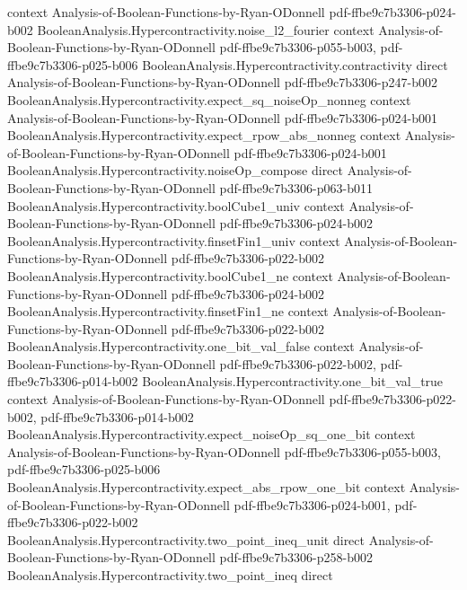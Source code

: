 \begin{lemma}
  {context}
  {Analysis-of-Boolean-Functions-by-Ryan-ODonnell}
  {pdf-ffbe9c7b3306-p024-b002}
\proofstep
  {BooleanAnalysis.Hypercontractivity.noise_l2_fourier}
  {context}
  {Analysis-of-Boolean-Functions-by-Ryan-ODonnell}
  {pdf-ffbe9c7b3306-p055-b003,
    pdf-ffbe9c7b3306-p025-b006}
\proofstep
  {BooleanAnalysis.Hypercontractivity.contractivity}
  {direct}
  {Analysis-of-Boolean-Functions-by-Ryan-ODonnell}
  {pdf-ffbe9c7b3306-p247-b002}
\proofstep
  {BooleanAnalysis.Hypercontractivity.expect_sq_noiseOp_nonneg}
  {context}
  {Analysis-of-Boolean-Functions-by-Ryan-ODonnell}
  {pdf-ffbe9c7b3306-p024-b001}
\proofstep
  {BooleanAnalysis.Hypercontractivity.expect_rpow_abs_nonneg}
  {context}
  {Analysis-of-Boolean-Functions-by-Ryan-ODonnell}
  {pdf-ffbe9c7b3306-p024-b001}
\proofstep
  {BooleanAnalysis.Hypercontractivity.noiseOp_compose}
  {direct}
  {Analysis-of-Boolean-Functions-by-Ryan-ODonnell}
  {pdf-ffbe9c7b3306-p063-b011}
\proofstep
  {BooleanAnalysis.Hypercontractivity.boolCube1_univ}
  {context}
  {Analysis-of-Boolean-Functions-by-Ryan-ODonnell}
  {pdf-ffbe9c7b3306-p024-b002}
\proofstep
  {BooleanAnalysis.Hypercontractivity.finsetFin1_univ}
  {context}
  {Analysis-of-Boolean-Functions-by-Ryan-ODonnell}
  {pdf-ffbe9c7b3306-p022-b002}
\proofstep
  {BooleanAnalysis.Hypercontractivity.boolCube1_ne}
  {context}
  {Analysis-of-Boolean-Functions-by-Ryan-ODonnell}
  {pdf-ffbe9c7b3306-p024-b002}
\proofstep
  {BooleanAnalysis.Hypercontractivity.finsetFin1_ne}
  {context}
  {Analysis-of-Boolean-Functions-by-Ryan-ODonnell}
  {pdf-ffbe9c7b3306-p022-b002}
\proofstep
  {BooleanAnalysis.Hypercontractivity.one_bit_val_false}
  {context}
  {Analysis-of-Boolean-Functions-by-Ryan-ODonnell}
  {pdf-ffbe9c7b3306-p022-b002,
    pdf-ffbe9c7b3306-p014-b002}
\proofstep
  {BooleanAnalysis.Hypercontractivity.one_bit_val_true}
  {context}
  {Analysis-of-Boolean-Functions-by-Ryan-ODonnell}
  {pdf-ffbe9c7b3306-p022-b002,
    pdf-ffbe9c7b3306-p014-b002}
\proofstep
  {BooleanAnalysis.Hypercontractivity.expect_noiseOp_sq_one_bit}
  {context}
  {Analysis-of-Boolean-Functions-by-Ryan-ODonnell}
  {pdf-ffbe9c7b3306-p055-b003,
    pdf-ffbe9c7b3306-p025-b006}
\proofstep
  {BooleanAnalysis.Hypercontractivity.expect_abs_rpow_one_bit}
  {context}
  {Analysis-of-Boolean-Functions-by-Ryan-ODonnell}
  {pdf-ffbe9c7b3306-p024-b001,
    pdf-ffbe9c7b3306-p022-b002}
\proofstep
  {BooleanAnalysis.Hypercontractivity.two_point_ineq_unit}
  {direct}
  {Analysis-of-Boolean-Functions-by-Ryan-ODonnell}
  {pdf-ffbe9c7b3306-p258-b002}
\proofstep
  {BooleanAnalysis.Hypercontractivity.two_point_ineq}
  {direct}

\end{lemma}
